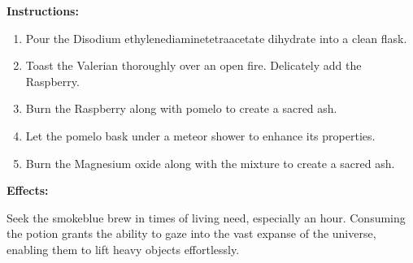 \documentclass{article}
\begin{document}
\textbf{Instructions:}

\begin{enumerate}
  \item Pour the Disodium ethylenediaminetetraacetate dihydrate into a clean flask.
  \item Toast the Valerian thoroughly over an open fire. Delicately add the Raspberry.
  \item Burn the Raspberry along with pomelo to create a sacred ash.
  \item Let the pomelo bask under a meteor shower to enhance its properties.
  \item Burn the Magnesium oxide along with the mixture to create a sacred ash.
\end{enumerate}

\textbf{Effects:}

Seek the smokeblue brew in times of living need, especially an hour. Consuming the potion grants the ability to gaze into the vast expanse of the universe, enabling them to lift heavy objects effortlessly.
\end{document}
